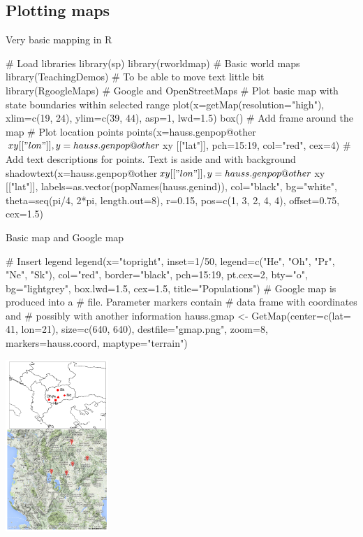 \documentclass[compress, ucs, xelatex, 11pt, xcolor=svgnames,
  hyperref={
    bookmarks=true,
    unicode=true,
    colorlinks=true,
    pdftitle={Molecular data in R},
    plainpages=false,
    pdfauthor={Vojtech Zeisek},
    pdfsubject={Course about phylogeny and evolution in R},
    pdfcreator={XeLaTeX},
    pdfkeywords={R, evolution, phylogeny, molecular data},
    linkcolor=Tomato,
    anchorcolor=SaddleBrown,
    citecolor=Goldenrod,
    filecolor=DarkMagenta,
    menucolor=Sienna,
    urlcolor=DarkTurquoise,
    pdftex},
  url={hyphens, lowtilde} %
  ]{beamer}
\begin{document}
\subsection{Plotting maps}

\begin{frame}[fragile]{Very basic mapping in R}
  \begin{spluscode}
    # Load libraries
    library(sp)
    library(rworldmap) # Basic world maps
    library(TeachingDemos) # To be able to move text little bit
    library(RgoogleMaps) # Google and OpenStreetMaps
    # Plot basic map with state boundaries within selected range
    plot(x=getMap(resolution="high"), xlim=c(19, 24), ylim=c(39, 44),
      asp=1, lwd=1.5)
    box() # Add frame around the map
    # Plot location points
    points(x=hauss.genpop@other$xy[["lon"]], y=hauss.genpop@other$xy
      [["lat"]], pch=15:19, col="red", cex=4)
    # Add text descriptions for points. Text is aside and with background
    shadowtext(x=hauss.genpop@other$xy[["lon"]], y=hauss.genpop@other$xy
      [["lat"]], labels=as.vector(popNames(hauss.genind)), col="black",
      bg="white", theta=seq(pi/4, 2*pi, length.out=8), r=0.15,
      pos=c(1, 3, 2, 4, 4), offset=0.75, cex=1.5)
  \end{spluscode}
\end{frame}

\begin{frame}[fragile]{Basic map and Google map}
\begin{multicols}{2}
  \begin{spluscode}
    # Insert legend
    legend(x="topright", inset=1/50,
      legend=c("He", "Oh", "Pr", "Ne",
      "Sk"), col="red", border="black",
      pch=15:19, pt.cex=2, bty="o",
      bg="lightgrey", box.lwd=1.5,
      cex=1.5, title="Populations")
    # Google map is produced into a
    # file. Parameter markers contain
    # data frame with coordinates and
    # possibly with another information
    hauss.gmap <- GetMap(center=c(lat=
      41, lon=21), size=c(640, 640),
      destfile="gmap.png", zoom=8,
      markers=hauss.coord,
      maptype="terrain")
  \end{spluscode}
  \begin{center}
    \includegraphics[height=6.5cm]{maps.png}
  \end{center}
\end{multicols}
\end{frame}
\end{document}
